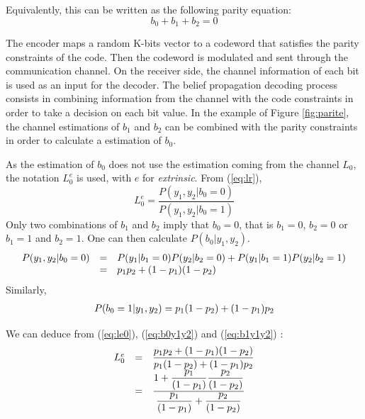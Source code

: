 Equivalently, this can be written as the following parity equation:
\begin{equation}
b_0 + b_1 + b_2 = 0
\end{equation}

The encoder maps a random K-bits vector to a codeword that satisfies the parity constraints of the code. Then the codeword is modulated and sent through the communication channel. On the receiver side, the channel information of each bit is used as an input for the decoder.
The belief propagation decoding process consists in combining information from the channel with the code constraints in order to take a decision on each bit value. In the example of Figure \ref{fig:parite}, the channel estimations of $b_1$ and $b_2$ can be combined with the parity constraints in order to calculate a estimation of $b_0$.

As the estimation of $b_0$ does not use the estimation coming from the channel $L_0$, the notation $L^e_0$ is used, with $e$ for \textit{extrinsic}.
From (\ref{eq:lr}),
\begin{equation}
L^e_0 = \dfrac{P(y_1,y_2 | b_0 = 0)}{P(y_1,y_2 | b_0 = 1)}
\label{eq:le0}
\end{equation}
Only two combinations of $b_1$ and $b_2$ imply that $b_0=0$, that is $b_1=0$, $b_2=0$ or $b_1=1$ and $b_2=1$. One can then calculate $P(b_0|y_1,y_2)$.
\begin{eqnarray}
\begin{array} {r c l}
P(y_1,y_2 | b_0 = 0) & = & P(y_1 | b_1 = 0)P(y_2 | b_2 = 0) + P(y_1 | b_1 = 1)P(y_2 | b_2 = 1)\\
\label{eq:b0y1y2full}
& = &  p_1p_2 + (1-p_1)(1-p_2)
\end{array}
\label{eq:b0y1y2}
\end{eqnarray}
Similarly,
\begin{eqnarray}
\begin{array} {r c l}
P(b_0 = 1 | y_1,y_2) =  p_1(1-p_2) + (1-p_1)p_2
\label{eq:b1y1y2}
\end{array}
\end{eqnarray}

We can deduce from (\ref{eq:le0}), (\ref{eq:b0y1y2}) and (\ref{eq:b1y1y2}) : 
\begin{eqnarray*}
\begin{array} {r c l}
L^e_0 & = & \dfrac{p_1p_2 + (1-p_1)(1-p_2)}{p_1(1-p_2) + (1-p_1)p_2} \\
& = & \dfrac{1 + \dfrac{p_1}{(1-p_1)}\dfrac{p_2}{(1-p_2)}}{\dfrac{p_1}{(1-p_1)}+\dfrac{p_2}{(1-p_2)}} 
\end{array}
\end{eqnarray*}

